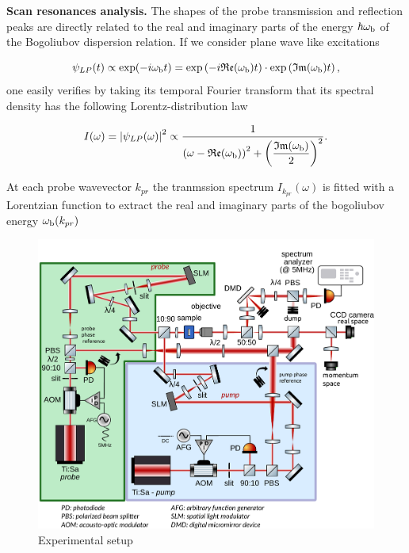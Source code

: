  \textbf{Scan resonances analysis.} The shapes of the probe transmission and reflection peaks are directly related to the real and imaginary parts of the energy $\hbar \omega_{\mathrm{b}}$ of the Bogoliubov dispersion relation.
  If we consider plane wave like excitations

\begin{equation}
    \psi_{LP}(t) \propto \mathrm{exp} (-i \omega_{\mathrm{b}} t) = \mathrm{exp} \left (- i \mathfrak{Re} (\omega_{\mathrm{b}}) t \right ) \cdot \mathrm{exp} \left( \mathfrak{Im} (\omega_{\mathrm{b}}) t \right),
\end{equation}
one easily verifies by taking its temporal Fourier transform that its spectral density has the following Lorentz-distribution law

\begin{equation}
    I(\omega) = \abs{\psi_{LP}(\omega)}^2 \propto \dfrac{1}{ \left(\omega - \mathfrak{Re}(\omega_{\mathrm{b}}) \right)^2 + \left( \dfrac{\mathfrak{Im}(\omega_{\mathrm{b}})}{2} \right)^2}.
\end{equation}

At each probe wavevector $k_{pr}$ the tranmssion spectrum $I_{k_{pr}}(\omega)$ is fitted with a Lorentzian function to extract the real and imaginary parts of the bogoliubov energy $\omega_{\mathrm{b}}(k_{pr})$

 \begin{figure}
    \centering
    \includegraphics[width=1\textwidth]{chap_custom_st/fig/set_up_spacetime.pdf}
    \caption{Experimental setup}
    \label{fig:setup}
\end{figure}





